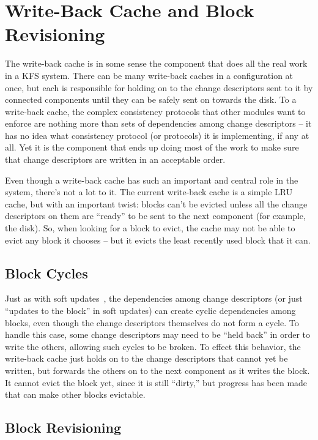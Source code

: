 \section{Write-Back Cache and Block Revisioning}

The write-back cache is in some sense the component that does all the real work
in a KFS system. There can be many write-back caches in a configuration at once,
but each is responsible for holding on to the change descriptors sent to it by
connected components until they can be safely sent on towards the disk. To a
write-back cache, the complex consistency protocols that other modules want to
enforce are nothing more than sets of dependencies among change descriptors --
it has no idea what consistency protocol (or protocols) it is implementing, if
any at all. Yet it is the component that ends up doing most of the work to make
sure that change descriptors are written in an acceptable order.

Even though a write-back cache has such an important and central role in the
system, there's not a lot to it. The current write-back cache is a simple LRU
cache, but with an important twist: blocks can't be evicted unless all the
change descriptors on them are ``ready'' to be sent to the next component (for
example, the disk). So, when looking for a block to evict, the cache may not be
able to evict any block it chooses -- but it evicts the least recently used
block that it can.

\subsection{Block Cycles}
\label{subsec:blockcycles}

Just as with soft updates~\cite{ganger00soft}, the dependencies among change
descriptors (or just ``updates to the block'' in soft updates) can create cyclic
dependencies among blocks, even though the change descriptors themselves do not
form a cycle. To handle this case, some change descriptors may need to be ``held
back'' in order to write the others, allowing such cycles to be broken.  To
effect this behavior, the write-back cache just holds on to the change
descriptors that cannot yet be written, but forwards the others on to the next
component as it writes the block. It cannot evict the block yet, since it is
still ``dirty,'' but progress has been made that can make other blocks
evictable.

\subsection{Block Revisioning}


